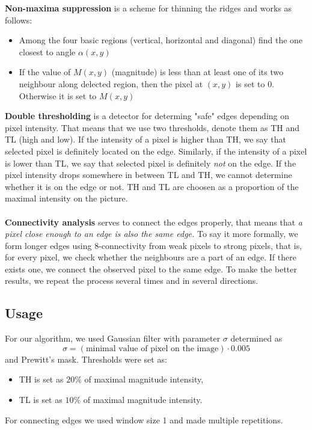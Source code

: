 \documentclass[a4paper,11pt]{article}
\begin{document}
\noindent
\textbf{Non-maxima suppression} is a scheme for thinning the ridges and works as follows:
\begin{itemize}
    \item Among the four basic regions (vertical, horizontal and diagonal) find the one closest to angle $\alpha(x, y)$
    \item If the value of $M(x, y)$ (magnitude) is less than at least one of its two neighbour along delected region, then the pixel at $(x, y)$ is set to $0$. Otherwise it is set to $M(x, y)$
\end{itemize}

\noindent
\textbf{Double thresholding} is a detector for determing "safe" edges depending on pixel intensity. That means that we use two thresholds, denote them as TH and TL (high and low). 
If the intensity of a pixel is higher than TH, we say that selected pixel is definitely located on the edge. 
Similarly, if the intensity of a pixel is lower than TL, we say that selected pixel is definitely \textit{not} on the edge.
If the pixel intensity drops somewhere in between TL and TH, we cannot determine whether it is on the edge or not.
TH and TL are choosen as a proportion of the maximal intensity on the picture. 
\\
\\
\noindent
\textbf{Connectivity analysis} serves to connect the edges properly, that means that \textit{a pixel close enough to an edge is also the same edge.}
To say it more formally, we form longer edges using 8-connectivity from weak pixels to strong pixels, that is, for every pixel, we check whether the neighbours are a part of an edge. If there exists one, we connect the observed pixel to the same edge.
To make the better results, we repeat the process several times and in several directions.



\subsection{Usage}

For our algorithm, we used Gaussian filter with parameter $\sigma$ determined as 
$$
\sigma = (\text{minimal value of pixel on the image}) \cdot 0.005
$$
and Prewitt's mask. Thresholds were set as:
\begin{itemize}
    \item TH is set as $20 \%$ of maximal magnitude intensity,
    \item TL is set as $10 \%$ of maximal magnitude intensity.
\end{itemize}    
For connecting edges we used window size 1 and made multiple repetitions.
\end{document}
